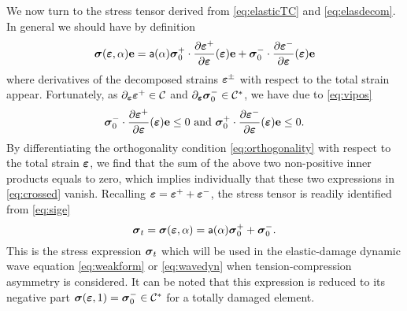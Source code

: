 We now turn to the stress tensor derived from \eqref{eq:elasticTC} and \eqref{eq:elasdecom}. In general we should have by definition
\begin{equation} \label{eq:sige}
\sig(\eps,\alpha)\vec{e}=\mathsf{a}(\alpha)\sig_0^+\cdot\frac{\partial\eps^+}{\partial\eps}(\eps)\vec{e}+\sig_0^-\cdot\frac{\partial\eps^-}{\partial\eps}(\eps)\vec{e}
\end{equation}
where derivatives of the decomposed strains $\eps^\pm$ with respect to the total strain appear. Fortunately, as $\partial_{\eps}\eps^+\in\mathcal{C}$ and $\partial_{\eps}\sig_0^-\in\mathcal{C}^*$, we have due to \eqref{eq:vipos}
\begin{equation} \label{eq:crossed}
\sig_0^-\cdot\frac{\partial\eps^+}{\partial\eps}(\eps)\vec{e}\leq 0\text{ and }\sig_0^+\cdot\frac{\partial\eps^-}{\partial\eps}(\eps)\vec{e}\leq 0.
\end{equation}
By differentiating the orthogonality condition \eqref{eq:orthogonality} with respect to the total strain $\eps$, we find that the sum of the above two non-positive inner products equals to zero, which implies individually that these two expressions in \eqref{eq:crossed} vanish. Recalling $\eps=\eps^++\eps^-$, the stress tensor is readily identified from \eqref{eq:sige}
\begin{equation} \label{eq:stressposneg}
\sig_t=\sig(\eps,\alpha)=\mathsf{a}(\alpha)\sig_0^++\sig_0^-.
\end{equation}
This is the stress expression $\sig_t$ which will be used in the elastic-damage dynamic wave equation \eqref{eq:weakform} or \eqref{eq:wavedyn} when tension-compression asymmetry is considered. It can be noted that this expression is reduced to its negative part $\sig(\eps,1)=\sig_0^-\in\mathcal{C}^*$ for a totally damaged element.

